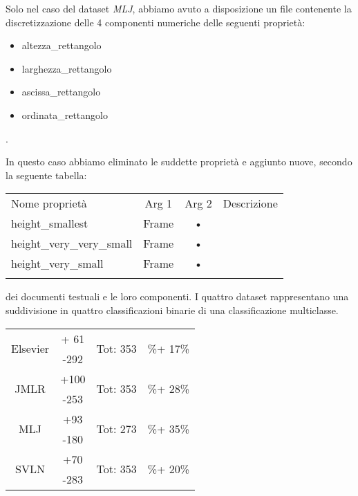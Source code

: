 Solo nel caso del dataset \emph{MLJ}, abbiamo avuto a disposizione un file contenente la discretizzazione delle 4 componenti numeriche delle seguenti proprietà: 
\begin{itemize}
\item altezza\_rettangolo
\item larghezza\_rettangolo
\item ascissa\_rettangolo
\item ordinata\_rettangolo
\end{itemize}.

In questo caso abbiamo eliminato le suddette proprietà e aggiunto nuove, secondo la seguente tabella:

\begin{table}[htbp]
\centering
\label{tab:predicati}
\small\begin{tabular}{lccl}
\toprule
\addlinespace
Nome proprietà & Arg 1 & Arg 2 & Descrizione \\
\addlinespace
\midrule
\addlinespace
height\_smallest & Frame & • \\ 
height\_very\_very\_small & Frame & • \\ 
height\_very\_small & Frame & • \\ 
\addlinespace
\bottomrule 
\end{tabular}
\end{table}


 

 dei documenti testuali e le loro componenti.
I quattro dataset rappresentano una suddivisione in quattro classificazioni binarie di una classificazione multiclasse.

\begin{table}[htbp]
	\centering
	\begin{tabular}{cccc}
		\multirow{2}{*}{Elsevier} & + 61 & \multirow{2}{*}{Tot: 353}& \multirow{2}{*}{\%+ 17\%} \\
		 & -292 &  & \\
		 \multirow{2}{*}{JMLR} & +100 & \multirow{2}{*}{Tot: 353} & \multirow{2}{*}{\%+ 28\%} \\
		 & -253 & & \\
 		 \multirow{2}{*}{MLJ} & +93 & \multirow{2}{*}{Tot: 273} & \multirow{2}{*}{\%+ 35\%} \\
 		 & -180 & & \\
 		 \multirow{2}{*}{SVLN} & +70 & \multirow{2}{*}{Tot: 353} & \multirow{2}{*}{\%+ 20\%} \\
 		 & -283 & & \\
	\end{tabular}%
	\label{tab:}
\end{table}

